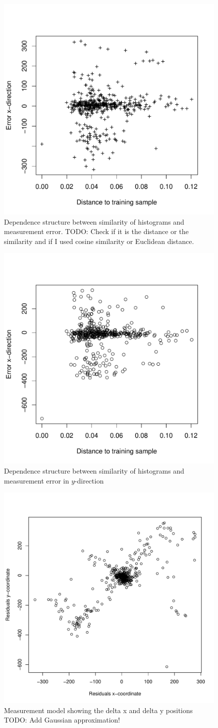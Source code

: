 \documentclass{report}
\begin{document}
\begin{figure}[h!]
\begin{center}
  \includegraphics[width=0.448\columnwidth]{dependency_dist_error_x}
  \caption{{\label{fig:cor_sim_confi} Dependence structure between
      similarity of histograms and measurement error.  TODO: Check if
      it is the distance or the similarity and if I used cosine
      similarity or Euclidean distance.%
    }}
\end{center}
\end{figure}

\begin{figure}[h!]
\begin{center}
\includegraphics[width=0.448\columnwidth]{dependency_dist_error_y}
\caption{{\label{fig:cor_sim_confi_y}
Dependence structure between similarity of histograms and measurement error in $y$-direction%
}}
\end{center}
\end{figure}

\begin{figure}[h!]
\label{fig:measurementmodel}
\begin{center}
\includegraphics[width=0.448\columnwidth]{measurement_model}
\caption{{Measurement model showing the delta x and delta y
    positions
TODO: Add Gaussian approximation!%
}}
\end{center}
\end{figure}
\end{document}
